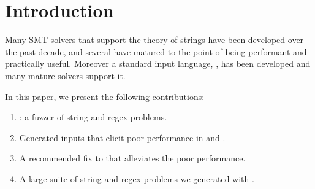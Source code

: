 \section{Introduction}

    Many SMT solvers that support the theory of strings have been developed over the past decade, and several have matured to the point of being performant and practically useful. Moreover a standard input language, \smt{}, has been developed and many mature solvers support it.

    In this paper, we present the following contributions:

    \begin{enumerate}
        \item \fuzzer{}: a fuzzer of \smt{} string and regex problems.
        \item Generated inputs that elicit poor performance in \us{} and \cvc{}.
        \item A recommended fix to \us{} that alleviates the poor performance.
        \item A large suite of \smt{} string and regex problems we generated with \fuzzer{}.
    \end{enumerate}
